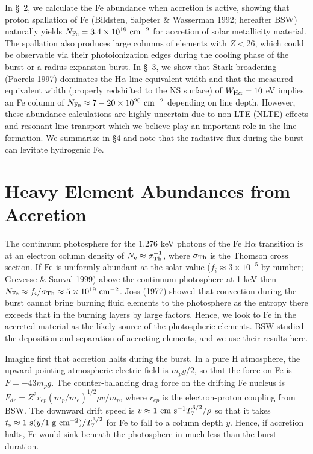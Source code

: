 \documentclass[iop,apjl,letterpaper]{emulateapj}
\newcommand{\Fe}{${\rm Fe} \ $}
\begin{document}
In \S~2, we calculate the Fe abundance when accretion is active,
showing that proton spallation of Fe (Bildsten, Salpeter \& Wasserman
1992; hereafter BSW) naturally yields $N_{\rm Fe} = 3.4 \times
10^{19}\ {\rm cm}^{-2}$ for accretion of solar metallicity
material. The spallation also produces large columns of elements with
$Z<26$, which could be observable via their photoionization edges
during the cooling phase of the burst or a radius expansion burst.  In
\S~3, we show that Stark broadening (Paerels 1997) dominates the
H$\alpha$ line equivalent width and that the measured equivalent width
(properly redshifted to the NS surface) of $W_{\rm H\alpha}=10$ eV
implies an Fe column of $N_{\rm Fe} \approx 7-20 \times 10^{20}\ {\rm
cm}^{-2}$ depending on line depth. However, these abundance
calculations are highly uncertain due to non-LTE (NLTE) effects and
resonant line transport which we believe play an important role in the
line formation.  We summarize in \S 4 and note that the radiative flux
during the burst can levitate hydrogenic Fe.

\section{Heavy Element Abundances from Accretion}

The continuum photosphere for the 1.276 keV photons of the Fe
H$\alpha$ transition is at an electron column density of $N_{\rm
e}\approx \sigma_{\rm Th}^{-1}$, where $\sigma_{\rm Th}$ is the
Thomson cross section. If \Fe is uniformly abundant at the solar value
($f_i \approx 3\times 10^{-5}$ by number; Grevesse \& Sauval 1999)
above the continuum photosphere at 1 keV then $N_{\rm Fe}\approx
f_i/\sigma_{\rm Th}\approx 5\times 10^{19}\ {\rm cm^{-2}}$. Joss
(1977) showed that convection during the burst cannot bring burning
fluid elements to the photosphere as the entropy there exceeds that in
the burning layers by large factors. Hence, we look to Fe in the
accreted material as the likely source of the photospheric
elements. BSW studied the deposition and separation of accreting
elements, and we use their results here.

Imagine first that accretion halts during the burst.  In a pure H
atmosphere, the upward pointing atmospheric electric field is
$m_pg/2$, so that the force on Fe is $F=-43m_pg$. The
counter-balancing drag force on the drifting Fe nucleus is
$F_{dr}=Z^2r_{ep}(m_p/m_e)^{1/2}\rho v/m_p$, where $r_{ep}$ is the
electron-proton coupling from BSW.  The downward drift speed is
$v\approx 1 \ {\rm cm \ s^{-1}}T_7^{3/2}/\rho$ so that it takes
$t_{\rm s}\approx 1 \ {\rm s}(y/1\ {\rm g \ cm^{-2}})/T_7^{3/2}$ for
Fe to fall to a column depth $y$.  Hence, if accretion halts, Fe would
sink beneath the photosphere in much less than the burst duration.
\end{document}
